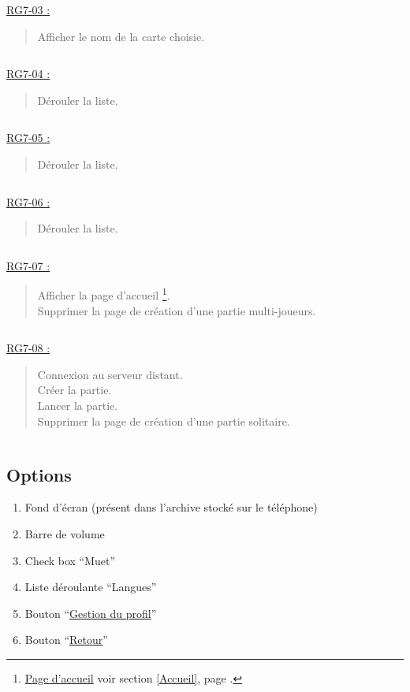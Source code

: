 \documentclass{report}
\begin{document}
			\underline{RG7-03 :}
				\begin{quote}
					Afficher le nom de la carte choisie.
				\end{quote}

			$\,$

			\underline{RG7-04 :}
				\begin{quote}
					Dérouler la liste.
				\end{quote}

			$\,$

			\underline{RG7-05 :}
				\begin{quote}
					Dérouler la liste.			
				\end{quote}	
				
			$\,$

			\underline{RG7-06 :}
				\begin{quote}
					Dérouler la liste.		
				\end{quote}

			$\,$

			\underline{RG7-07 :}
				\begin{quote}
					Afficher la page d'accueil%
						\footnote[1]{
							\hyperlink{Page d'accueil}{Page d'accueil}
							\og voir section \ref{Accueil}, page \pageref{Accueil}.\fg
						}.\\
					Supprimer la page de création d'une partie multi-joueurs.
				\end{quote}
				
			$\,$

			\underline{RG7-08 :}
				\begin{quote}
					 Connexion au serveur distant.\\
					 Créer la partie.\\
					 Lancer la partie.\\
					 Supprimer la page de création d'une partie solitaire.
				\end{quote}
				
			$\,$
	 
\newpage

	\subsection{Options}
	
		\hypertarget{Options}{}
		\label{Options}
	
		\begin{center}
			
		\end{center}
				
		\begin{enumerate}
		  \item Fond d'écran (présent dans l'archive stocké sur le téléphone)
		  \item Barre de volume
		  \item Check box ``Muet''
		  \item Liste déroulante ``Langues''
		  \item Bouton ``\hyperlink{Gestion du profil}{Gestion du profil}''
		  \item Bouton ``\hyperlink{Accueil}{Retour}''
		\end{enumerate}
\end{document}
